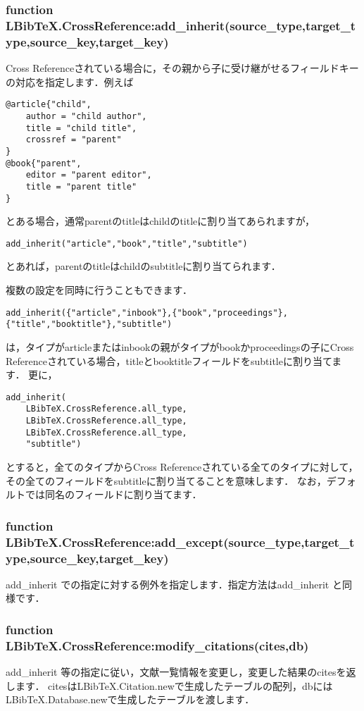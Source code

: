 \documentclass[dvipdfmx,a4paper]{jsarticle}
\begin{document}
\subsubsection{function LBibTeX.CrossReference:add\_inherit(source\_type,target\_type,source\_key,target\_key)}
Cross Referenceされている場合に，その親から子に受け継がせるフィールドキーの対応を指定します．例えば
\begin{verbatim}
@article{"child",
    author = "child author",
    title = "child title",
    crossref = "parent"
}
@book{"parent",
    editor = "parent editor",
    title = "parent title"
}
\end{verbatim}
とある場合，通常parentのtitleはchildのtitleに割り当てあられますが，
\begin{lstlisting}
add_inherit("article","book","title","subtitle")
\end{lstlisting}
とあれば，parentのtitleはchildのsubtitleに割り当てられます．

複数の設定を同時に行うこともできます．
\begin{lstlisting}
add_inherit({"article","inbook"},{"book","proceedings"},{"title","booktitle"},"subtitle")
\end{lstlisting}
は，タイプがarticleまたはinbookの親がタイプがbookかproceedingsの子にCross Referenceされている場合，titleとbooktitleフィールドをsubtitleに割り当てます．
更に，
\begin{lstlisting}
add_inherit(
	LBibTeX.CrossReference.all_type,
	LBibTeX.CrossReference.all_type,
	LBibTeX.CrossReference.all_type,
	"subtitle")
\end{lstlisting}
とすると，全てのタイプからCross Referenceされている全てのタイプに対して，その全てのフィールドをsubtitleに割り当てることを意味します．
なお，デフォルトでは同名のフィールドに割り当てます．

\subsubsection{function LBibTeX.CrossReference:add\_except(source\_type,target\_type,source\_key,target\_key)}
add\_inherit での指定に対する例外を指定します．指定方法はadd\_inherit と同様です．

\subsubsection{function LBibTeX.CrossReference:modify\_citations(cites,db)}
add\_inherit 等の指定に従い，文献一覧情報を変更し，変更した結果のcitesを返します．
citesはLBibTeX.Citation.newで生成したテーブルの配列，dbにはLBibTeX.Database.newで生成したテーブルを渡します．
\end{document}
